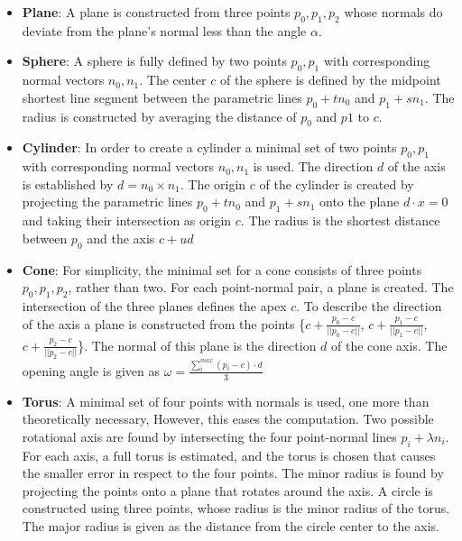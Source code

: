 \begin{itemize}
    \item \textbf{Plane}: A plane is constructed from three points $p_0, p_1, p_2$ whose normals do deviate from the plane's normal less than the angle $\alpha$. 
    
    \item \textbf{Sphere}: A sphere is fully defined by two points $p_0, p_1$ with corresponding normal vectors $n_0, n_1$. The center $c$ of the sphere is defined by the midpoint shortest line segment between the parametric lines $p_0 + tn_0$ and $p_1 + sn_1$. The radius is constructed by averaging the distance of $p_0$ and $p1$ to $c$.

    \item \textbf{Cylinder}:
    In order to create a cylinder a minimal set of two points  $p_0, p_1$ with corresponding normal vectors $n_0, n_1$ is used. The direction $d$ of the axis is established by $d = n_0 \times n_1$. The origin $c$ of the cylinder is created by projecting the parametric lines $p_0 + tn_0$ and $p_1 + sn_1$ onto the plane $d \cdot x = 0$ and taking their intersection as origin $c$. The radius is the shortest distance between $p_0$ and the axis $c + ud$
    
    \item \textbf{Cone}:
    For simplicity, the minimal set for a cone consists of three points $p_0, p_1, p_2$, rather than two. For each point-normal pair, a plane is created. The intersection of the three planes defines the apex $c$. To describe the direction of the axis a plane is constructed from the points \{$c +  \frac{p_0 - c}{||p_0 - c||}$, $c +  \frac{p_1 - c}{||p_1 - c||}$, $c +  \frac{p_2 - c}{||p_2 - c||}$\}. The normal of this plane is the direction $d$ of the cone axis. The opening angle is given as $\omega = \frac{\sum_{i}^{max} (p_i - c)\cdot d}{3}$
    
    \item \textbf{Torus}:
    A minimal set of four points with normals is used, one more than theoretically necessary, However, this eases the computation.
    Two possible rotational axis are found by intersecting the four point-normal lines $p_i +  \lambda n_i$\cite{marshall2001robust}. For each axis, a full torus is estimated, and the torus is chosen that causes the smaller error in respect to the four points. The minor radius is found by projecting the points onto a plane that rotates around the axis. A circle is constructed using three points, whose radius is the minor radius of the torus. The major radius is given as the distance from the circle center to the axis. 


\end{itemize} 

